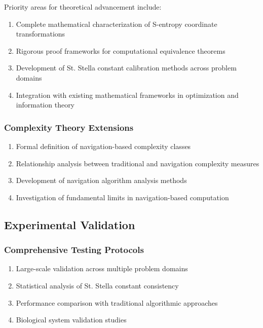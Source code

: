 \documentclass[11pt]{article}
\begin{document}
Priority areas for theoretical advancement include:

\begin{enumerate}
\item Complete mathematical characterization of S-entropy coordinate transformations
\item Rigorous proof frameworks for computational equivalence theorems
\item Development of St. Stella constant calibration methods across problem domains
\item Integration with existing mathematical frameworks in optimization and information theory
\end{enumerate}

\subsubsection{Complexity Theory Extensions}

\begin{enumerate}
\item Formal definition of navigation-based complexity classes
\item Relationship analysis between traditional and navigation complexity measures
\item Development of navigation algorithm analysis methods
\item Investigation of fundamental limits in navigation-based computation
\end{enumerate}

\subsection{Experimental Validation}

\subsubsection{Comprehensive Testing Protocols}

\begin{enumerate}
\item Large-scale validation across multiple problem domains
\item Statistical analysis of St. Stella constant consistency
\item Performance comparison with traditional algorithmic approaches
\item Biological system validation studies
\end{enumerate}
\end{document}
